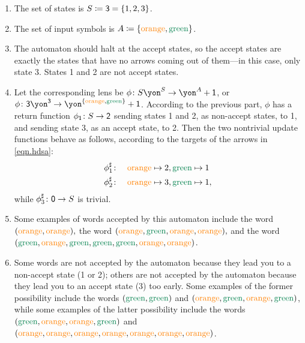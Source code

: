 \documentclass[Book-Poly]{subfiles}
\begin{document}
\begin{exercise}
\begin{solution}
\begin{enumerate}
    \item The set of states is $S\coloneqq\textsf{3}=\{1,2,3\}$.
    \item The set of input symbols is $A\coloneqq\{{\color{orange}\text{orange}},{\color{dgreen}\text{green}}\}$.
    \item The automaton should halt at the accept states, so the accept states are exactly the states that have no arrows coming out of them---in this case, only state 3.
    States 1 and 2 are not accept states.
    \item Let the corresponding lens be $\phi\colon S\yon^S\to\yon^A+\1$, or $\phi\colon \3\yon^\3\to\yon^{\{{\color{orange}\text{orange}},{\color{dgreen}\text{green}}\}}+\1$.
    According to the previous part, $\phi$ has a return function $\phi_{\textsf{1}}\colon S\to\textsf{2}$ sending states 1 and 2, as non-accept states, to 1, and sending state 3, as an accept state, to 2.
    Then the two nontrivial update functions behave as follows, according to the targets of the arrows in \eqref{eqn.hdsa}:
    \begin{align*}
        \phi^\sharp_1&\colon\quad{\color{orange}\text{orange}}\mapsto2,{\color{dgreen}\text{green}}\mapsto1\\
        \phi^\sharp_2&\colon\quad{\color{orange}\text{orange}}\mapsto3,{\color{dgreen}\text{green}}\mapsto1,
    \end{align*}
    while $\phi^\sharp_3\colon\textsf{0}\to S$ is trivial.
    \item Some examples of words accepted by this automaton include the word $({\color{orange}\text{orange}},{\color{orange}\text{orange}}),$ the word $({\color{orange}\text{orange}},{\color{dgreen}\text{green}},{\color{orange}\text{orange}},{\color{orange}\text{orange}}),$ and the word $({\color{dgreen}\text{green}},{\color{orange}\text{orange}},{\color{dgreen}\text{green}},{\color{dgreen}\text{green}},{\color{dgreen}\text{green}},{\color{orange}\text{orange}},{\color{orange}\text{orange}})$.
    \item Some words are not accepted by the automaton because they lead you to a non-accept state (1 or 2); others are not accepted by the automaton because they lead you to an accept state (3) too early.
    Some examples of the former possibility include the words $({\color{dgreen}\text{green}},{\color{dgreen}\text{green}})$ and $({\color{orange}\text{orange}},{\color{dgreen}\text{green}},{\color{orange}\text{orange}},{\color{dgreen}\text{green}})$, while some examples of the latter possibility include the words $({\color{dgreen}\text{green}},{\color{orange}\text{orange}},{\color{orange}\text{orange}},{\color{dgreen}\text{green}})$ and $({\color{orange}\text{orange}},{\color{orange}\text{orange}},{\color{orange}\text{orange}},{\color{orange}\text{orange}},{\color{orange}\text{orange}},{\color{orange}\text{orange}},{\color{orange}\text{orange}})$.
\end{enumerate}
\end{solution}
\end{exercise}
\end{document}
